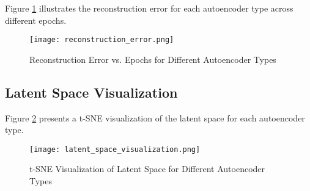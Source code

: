 Figure \ref{fig:reconstruction_error} illustrates the reconstruction error for each autoencoder type across different epochs.

\begin{figure}[htbp]
    \centering
    \texttt{[image: reconstruction\_error.png]}
    \caption{Reconstruction Error vs. Epochs for Different Autoencoder Types}
    \label{fig:reconstruction_error}
\end{figure}

\subsection{Latent Space Visualization}

Figure \ref{fig:latent_space} presents a t-SNE visualization of the latent space for each autoencoder type.

\begin{figure}[htbp]
    \centering
    \texttt{[image: latent\_space\_visualization.png]}
    \caption{t-SNE Visualization of Latent Space for Different Autoencoder Types}
    \label{fig:latent_space}
\end{figure}



